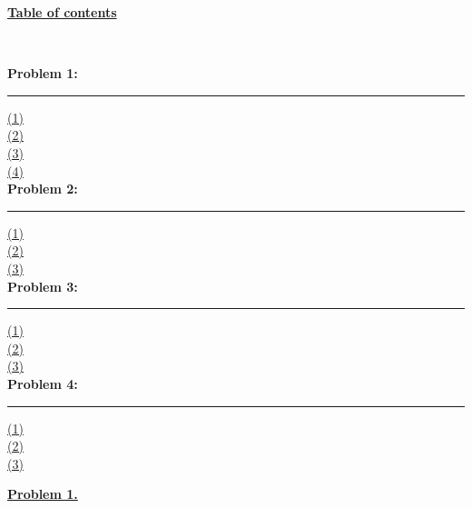 \documentclass[12pt]{article}
\begin{document}
\begin{center}
	\hypertarget{toc}{\LARGE \noindent \underline{\textbf{Table of contents}}}\\
\end{center}
\noindent \textbf{Problem 1:}
\vspace{1mm}
\hrule
\vspace{1mm}
\noindent\hyperlink{1.1}{(1)}\\
\hyperlink{1.2}{(2)}\\
\hyperlink{1.3}{(3)}\\
\hyperlink{1.4}{(4)}\\

\noindent \textbf{Problem 2:}
\vspace{1mm}
\hrule
\vspace{1mm}
\noindent\hyperlink{2.1}{(1)}\\
\hyperlink{2.2}{(2)}\\
\hyperlink{2.3}{(3)}\\

\noindent \textbf{Problem 3:}
\vspace{1mm}
\hrule
\vspace{1mm}
\noindent\hyperlink{3.1}{(1)}\\
\noindent\hyperlink{3.2}{(2)}\\
\noindent\hyperlink{3.3}{(3)}\\

\noindent \textbf{Problem 4:}
\vspace{1mm}
\hrule
\vspace{1mm}
\noindent\hyperlink{4.1}{(1)}\\
\hyperlink{4.2}{(2)}\\
\hyperlink{4.3}{(3)}\\[50mm]
\newpage


{\LARGE \noindent \underline{\textbf{Problem 1.}}}\\
\end{document}
